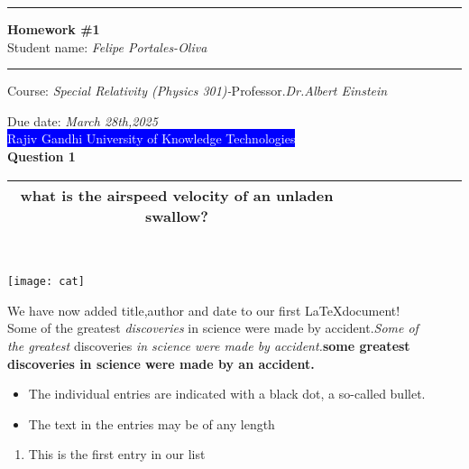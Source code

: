 \documentclass{article}
\begin{document}
\begin{center}
\hrule
\vspace{2mm}
{\bf{\huge{Homework {\LARGE{\#}1}}}}\\
\vspace{2mm}
Student name: \textit{Felipe Portales-Oliva}
\vspace{2mm}
\hrule
\vspace{2mm}
\begin{flushleft}
Course: \textit{Special Relativity (Physics 301)-}Professor.\textit{Dr.Albert Einstein}\\
\end{flushleft}
Due date: \textit{{March {28th,2025}}}\\
\vspace{2mm}
\colorbox{blue}{\textcolor{white}{Rajiv Gandhi University of Knowledge Technologies}}\\
\vspace{4mm}
{\bf{Question 1}}\\
\vspace{2mm}
\begin{flushleft}
\begin{tabular}{|c c c c c c c c c|}
\hline
what is the airspeed velocity of an unladen swallow?&  &  &  &  &  &  &  & \\
\hline
\end{tabular}
\\ 
\vspace{3mm}
\begin{center}
\texttt{[image: cat]}
\end{center}
\newpage
\hspace{5mm}We have now added title,author and date to our first \LaTeX document!\\
Some of the greatest \textit{discoveries} in science were made by accident.\textsl{Some of\\ the greatest} discoveries \textsl{in science were made by accident.}\bf{some greatest \\discoveries in science were made by an accident.}
\end{flushleft}
\begin{itemize}
\item The individual entries are indicated with a black dot, a so-called bullet.
\item The text in the entries may be of any length
\end{itemize}
\begin{enumerate}
\item This is the first entry in our list

\end{enumerate}
\end{center}
\end{document}
